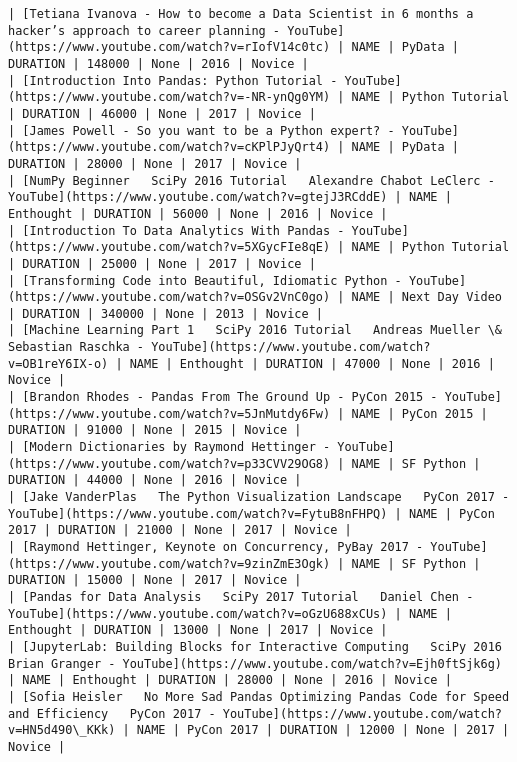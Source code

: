 \documentclass[11pt]{article}
\begin{document}
    \begin{Verbatim}[commandchars=\\\{\}]
| [Tetiana Ivanova - How to become a Data Scientist in 6 months a hacker’s approach to career planning - YouTube](https://www.youtube.com/watch?v=rIofV14c0tc) | NAME | PyData | DURATION | 148000 | None | 2016 | Novice |
| [Introduction Into Pandas: Python Tutorial - YouTube](https://www.youtube.com/watch?v=-NR-ynQg0YM) | NAME | Python Tutorial | DURATION | 46000 | None | 2017 | Novice |
| [James Powell - So you want to be a Python expert? - YouTube](https://www.youtube.com/watch?v=cKPlPJyQrt4) | NAME | PyData | DURATION | 28000 | None | 2017 | Novice |
| [NumPy Beginner   SciPy 2016 Tutorial   Alexandre Chabot LeClerc - YouTube](https://www.youtube.com/watch?v=gtejJ3RCddE) | NAME | Enthought | DURATION | 56000 | None | 2016 | Novice |
| [Introduction To Data Analytics With Pandas - YouTube](https://www.youtube.com/watch?v=5XGycFIe8qE) | NAME | Python Tutorial | DURATION | 25000 | None | 2017 | Novice |
| [Transforming Code into Beautiful, Idiomatic Python - YouTube](https://www.youtube.com/watch?v=OSGv2VnC0go) | NAME | Next Day Video | DURATION | 340000 | None | 2013 | Novice |
| [Machine Learning Part 1   SciPy 2016 Tutorial   Andreas Mueller \& Sebastian Raschka - YouTube](https://www.youtube.com/watch?v=OB1reY6IX-o) | NAME | Enthought | DURATION | 47000 | None | 2016 | Novice |
| [Brandon Rhodes - Pandas From The Ground Up - PyCon 2015 - YouTube](https://www.youtube.com/watch?v=5JnMutdy6Fw) | NAME | PyCon 2015 | DURATION | 91000 | None | 2015 | Novice |
| [Modern Dictionaries by Raymond Hettinger - YouTube](https://www.youtube.com/watch?v=p33CVV29OG8) | NAME | SF Python | DURATION | 44000 | None | 2016 | Novice |
| [Jake VanderPlas   The Python Visualization Landscape   PyCon 2017 - YouTube](https://www.youtube.com/watch?v=FytuB8nFHPQ) | NAME | PyCon 2017 | DURATION | 21000 | None | 2017 | Novice |
| [Raymond Hettinger, Keynote on Concurrency, PyBay 2017 - YouTube](https://www.youtube.com/watch?v=9zinZmE3Ogk) | NAME | SF Python | DURATION | 15000 | None | 2017 | Novice |
| [Pandas for Data Analysis   SciPy 2017 Tutorial   Daniel Chen - YouTube](https://www.youtube.com/watch?v=oGzU688xCUs) | NAME | Enthought | DURATION | 13000 | None | 2017 | Novice |
| [JupyterLab: Building Blocks for Interactive Computing   SciPy 2016   Brian Granger - YouTube](https://www.youtube.com/watch?v=Ejh0ftSjk6g) | NAME | Enthought | DURATION | 28000 | None | 2016 | Novice |
| [Sofia Heisler   No More Sad Pandas Optimizing Pandas Code for Speed and Efficiency   PyCon 2017 - YouTube](https://www.youtube.com/watch?v=HN5d490\_KKk) | NAME | PyCon 2017 | DURATION | 12000 | None | 2017 | Novice |

\end{Verbatim}
\end{document}
